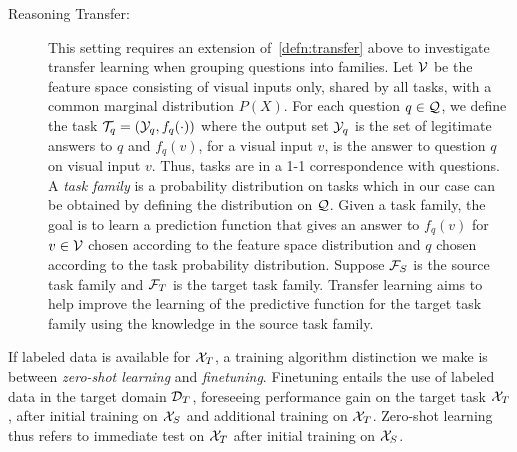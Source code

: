 \begin{description}
	\item[Reasoning Transfer:]
	This setting requires an extension of~\cref{defn:transfer} above to investigate transfer learning when
	grouping questions into families. Let $\mathcal{V}$ be the feature space consisting of visual inputs only, shared by
	all tasks, with a common marginal distribution $P(X)$. For each question $q \in \mathcal{Q}$, we define the task
	$\mathcal{T}_q = (\mathcal{Y}_q, f_q(\cdot))$ where
	the output set $\mathcal{Y}_q$ is the set of legitimate answers to $q$ and $f_q(v)$, for a visual input $v$,
	is the answer to question $q$ on visual input $v$.
	Thus, tasks are in a 1-1 correspondence with questions.
	A \emph{task family} is a probability distribution on tasks which in our case can be obtained by defining the distribution on $\mathcal{Q}$.
	Given a task family, the goal is to learn a prediction function that gives an answer to $f_q(v)$ for $v \in \mathcal{V}$ chosen according
	to the feature space distribution and $q$ chosen according to the task probability distribution.
	Suppose $\mathcal{F}_S$ is the source task family and $\mathcal{F}_T$ is the target task family.
	Transfer learning aims to help improve the learning of the predictive function for the target task family
	using the knowledge in the source task family.

\end{description}

If labeled data is available for $\mathcal{X}_T$, a training algorithm distinction we make is between \emph{zero-shot learning} and \emph{finetuning}. Finetuning entails the use of labeled data in the target domain $\mathcal{D}_T$, foreseeing performance gain on the target task $\mathcal{X}_T$, after initial training on $\mathcal{X}_S$ and additional training on $\mathcal{X}_T$. Zero-shot learning thus refers to immediate test on $\mathcal{X}_T$ after initial training on $\mathcal{X}_S$.
